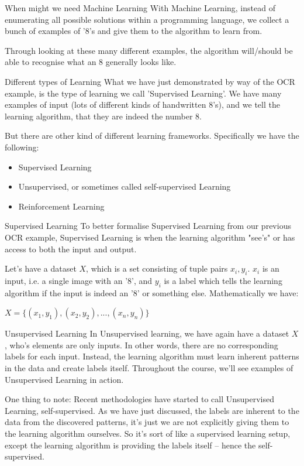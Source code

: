 \documentclass[10pt]{beamer}
\begin{document}
\begin{frame}[label={sec:orgba6157f}]{When might we need Machine Learning}
With Machine Learning, instead of enumerating all possible solutions within a
programming language, we collect a bunch of examples of '8's and give them to the
algorithm to learn from.

Through looking at these many different examples, the algorithm will/should be able
to recognise what an 8 generally looks like.
\end{frame}

\begin{frame}[label={sec:org556951b}]{Different types of Learning}
What we have just demonstrated by way of the OCR example, is the type of learning we
call 'Supervised Learning'. We have many examples of input (lots of different kinds
of handwritten 8's), and we tell the learning algorithm, that they are indeed the
number 8.

But there are other kind of different learning frameworks. Specifically we have the
following:

\begin{itemize}
\item Supervised Learning
\item Unsupervised, or sometimes called self-supervised Learning
\item Reinforcement Learning
\end{itemize}
\end{frame}

\begin{frame}[label={sec:org5e033a1}]{Supervised Learning}
To better formalise Supervised Learning from our previous OCR example, Supervised
Learning is when the learning algorithm "see's" or has access to both the input and
output.

Let's have a dataset \(X\), which is a set consisting of tuple pairs \(x_i, y_i\). \(x_i\)
is an input, i.e. a single image with an '8', and \(y_i\) is a label which tells the
learning algorithm if the input is indeed an '8' or something else. Mathematically we have:

\(X = \{(x_1, y_1), (x_2, y_2), ..., (x_n, y_n)\}\)
\end{frame}

\begin{frame}[label={sec:org9f317fe}]{Unsupervised Learning}
In Unsupervised learning, we have again have a dataset \(X\), who's elements are only
inputs. In other words, there are no corresponding labels for each input. Instead,
the learning algorithm must learn inherent patterns in the data and create labels
itself. Throughout the course, we'll see examples of Unsupervised Learning in action.

One thing to note: Recent methodologies have started to call Unsupervised Learning,
self-supervised. As we have just discussed, the labels are inherent to the data from
the discovered patterns, it's just we are not explicitly giving them to the learning
algorithm ourselves. So it's sort of like a supervised learning setup, except the
learning algorithm is providing the labels itself -- hence the self-supervised.
\end{frame}
\end{document}

